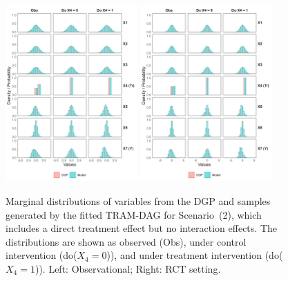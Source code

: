 \begin{figure}[htbp]
\centering
\includegraphics[width=0.45\textwidth]{img/results/observ_scenario2_sampling_distributions_vertical.png}
\includegraphics[width=0.45\textwidth]{img/results/rct_scenario2_sampling_distributions_vertical.png}
\caption{Marginal distributions of variables from the DGP and samples generated by the fitted TRAM-DAG for Scenario~(2), which includes a direct treatment effect but no interaction effects. The distributions are shown as observed (Obs), under control intervention (do($X_4 = 0$)), and under treatment intervention (do($X_4 = 1$)). Left: Observational; Right: RCT setting.}
\label{fig:scenario2_sampling_distributions_vertical}
\end{figure}

